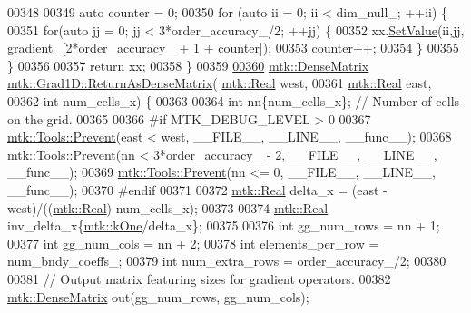 \begin{DoxyCode}
{{00348 
00349   \textcolor{keyword}{auto} counter = 0;
00350   \textcolor{keywordflow}{for} (\textcolor{keyword}{auto} ii = 0; ii < dim\_null\_; ++ii) \{
00351     \textcolor{keywordflow}{for}(\textcolor{keyword}{auto} jj = 0; jj < 3*order\_accuracy\_/2; ++jj) \{
00352       xx.\hyperlink{classmtk_1_1DenseMatrix_ae0f873a6d3a734da467cafb817da64ae}{SetValue}(ii,jj, gradient\_[2*order\_accuracy\_ + 1 + counter]);
00353       counter++;
00354     \}
00355   \}
00356 
00357   \textcolor{keywordflow}{return} xx;
00358 \}
00359 
\hypertarget{mtk__grad__1d_8cc_source_l00360}{}\hyperlink{classmtk_1_1Grad1D_a4218516bfb43f683559322ea97058c78}{00360} \hyperlink{classmtk_1_1DenseMatrix}{mtk::DenseMatrix} \hyperlink{classmtk_1_1Grad1D_a4218516bfb43f683559322ea97058c78}{mtk::Grad1D::ReturnAsDenseMatrix}(
      \hyperlink{group__c01-roots_gac080bbbf5cbb5502c9f00405f894857d}{mtk::Real} west,
00361                                                   \hyperlink{group__c01-roots_gac080bbbf5cbb5502c9f00405f894857d}{mtk::Real} east,
00362                                                   \textcolor{keywordtype}{int} num\_cells\_x) \{
00363 
00364   \textcolor{keywordtype}{int} nn\{num\_cells\_x\}; \textcolor{comment}{// Number of cells on the grid.}
00365 
00366 \textcolor{preprocessor}{  #if MTK\_DEBUG\_LEVEL > 0}
00367   \hyperlink{classmtk_1_1Tools_afe5bb096309258e2e72503fd7b41c7e0}{mtk::Tools::Prevent}(east < west, \_\_FILE\_\_, \_\_LINE\_\_, \_\_func\_\_);
00368   \hyperlink{classmtk_1_1Tools_afe5bb096309258e2e72503fd7b41c7e0}{mtk::Tools::Prevent}(nn < 3*order\_accuracy\_ - 2, \_\_FILE\_\_, \_\_LINE\_\_, \_\_func\_\_);
00369   \hyperlink{classmtk_1_1Tools_afe5bb096309258e2e72503fd7b41c7e0}{mtk::Tools::Prevent}(nn <= 0, \_\_FILE\_\_, \_\_LINE\_\_, \_\_func\_\_);
00370 \textcolor{preprocessor}{  #endif}
00371 
00372   \hyperlink{group__c01-roots_gac080bbbf5cbb5502c9f00405f894857d}{mtk::Real} delta\_x = (east - west)/((\hyperlink{group__c01-roots_gac080bbbf5cbb5502c9f00405f894857d}{mtk::Real}) num\_cells\_x);
00373 
00374   \hyperlink{group__c01-roots_gac080bbbf5cbb5502c9f00405f894857d}{mtk::Real} inv\_delta\_x\{\hyperlink{group__c01-roots_ga26407c24d43b6b95480943340d285c71}{mtk::kOne}/delta\_x\};
00375 
00376   \textcolor{keywordtype}{int} gg\_num\_rows = nn + 1;
00377   \textcolor{keywordtype}{int} gg\_num\_cols = nn + 2;
00378   \textcolor{keywordtype}{int} elements\_per\_row = num\_bndy\_coeffs\_;
00379   \textcolor{keywordtype}{int} num\_extra\_rows = order\_accuracy\_/2;
00380 
00381   \textcolor{comment}{// Output matrix featuring sizes for gradient operators.}
00382   \hyperlink{classmtk_1_1DenseMatrix}{mtk::DenseMatrix} out(gg\_num\_rows, gg\_num\_cols);
}}
\end{DoxyCode}
